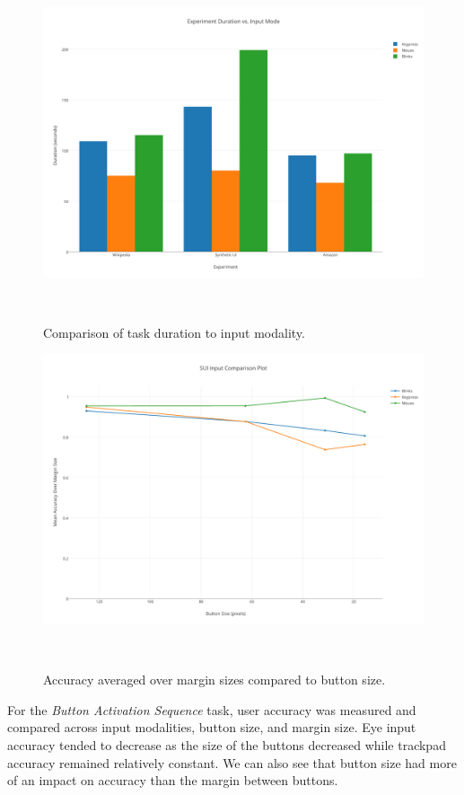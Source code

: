 \documentclass{sigchi}
\begin{document}
\begin{figure}
\centering
  \includegraphics[width=0.9\columnwidth]{figures/task-durations.pdf}
  \caption{Comparison of task duration to input modality.
  }~\label{fig:task-durations}
\end{figure}

\begin{figure}
\centering
  \includegraphics[width=0.9\columnwidth]{figures/mean-accuracy.pdf}
  \caption{Accuracy averaged over margin sizes compared to button size.
  }~\label{fig:mean-accuracy}
\end{figure}

For the \emph{Button Activation Sequence} task, user accuracy was measured
and compared across input modalities, button size, and margin size. Eye
input accuracy tended to decrease as the size of the buttons decreased while
trackpad accuracy remained relatively constant. We can also see that button
size had more of an impact on accuracy than the margin between buttons.
\end{document}
